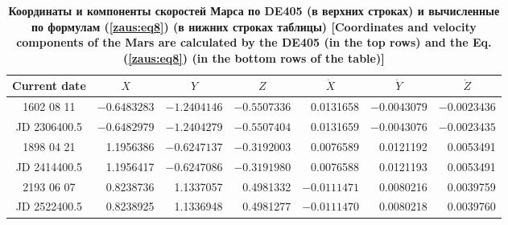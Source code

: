 \begin{table}
\center \small
\begin{minipage}[t]{160mm}
\centering
\caption{\bf Координаты и компоненты скоростей Марса по DE405 (в верхних строках) и вычисленные по формулам  (\ref{zaus:eq8}) (в нижних строках таблицы) [Coordinates and velocity components of the Mars are calculated by the  DE405 (in the top rows) and the Eq. (\ref{zaus:eq8}) (in the bottom rows of the table)]
\vspace{-3mm}}
\begin{tabular}{|c|r|r|r|r|r|r|}
\hline
\footnotesize
\rule{0mm}{12pt}%
Current date & \multicolumn{1}{c|}{\footnotesize $X$}&	\multicolumn{1}{c|}{\footnotesize $Y$}&	\multicolumn{1}{c|}{\footnotesize $Z$}&	\multicolumn{1}{c|}{\footnotesize $\dot{X}$}&	\multicolumn{1}{c|}{\footnotesize $\dot{Y}$}&	\multicolumn{1}{c|}{\footnotesize$\dot{Z}$}\\ \hline
\rule{0mm}{14pt}%
%
1602 08 11&	$-0.6483283$&	$-1.2404146$&	$-0.5507336$&	0.0131658&	$-0.0043079$&	 $ -0.0023436$\\
JD 2306400.5&	$-0.6482979$&	$-1.2404279$&	$-0.5507404$&	0.0131659&	$-0.0043076$&	  $-0.0023435$\\ \hline
1898 04 21&	1.1956386&	$-0.6247137$&	$-0.3192003$&	0.0076589 &	0.0121192&	  0.0053491\\
JD 2414400.5&	1.1956417&	$-0.6247086$&	$-0.3191980$&	0.0076588 &	0.0121193&	  0.0053491\\ \hline
2193 06 07&	0.8238736&	1.1337057&	0.4981332&	$-0.0111471$&	0.0080216&	  0.0039759 \\
JD 2522400.5&	0.8238925&	1.1336948&	0.4981277&	$-0.0111470$&	0.0080218&	  0.0039760 \\ \hline
\end{tabular}
\label{table:zausaev:tabl8}



\vspace{5mm}



\end{minipage}
\end{table}
